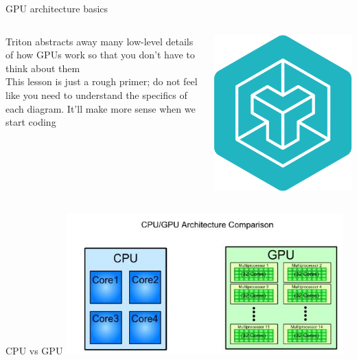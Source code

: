 \documentclass[aspectratio=169]{beamer}
\begin{document}
\begin{frame}{GPU architecture basics}
\begin{columns}[T]
    \begin{column}[T]{0.5\textwidth}
    Triton abstracts away many low-level details of how GPUs work so that you don't have to think about them \\
    \vspace{0.1in}
    This lesson is just a rough primer; do not feel like you need to understand the specifics of each diagram. It'll make more sense when we start coding
    \end{column}
    \begin{column}{0.5\textwidth}
        \includegraphics[height=0.8\textheight]{pics/triton-logo.png}
    \end{column}
\end{columns}
\end{frame}

\begin{frame}{CPU vs GPU}
\centering
\includegraphics[width=0.8\textwidth]{pics/architecture_comparison-2717927587.jpg}
\end{frame}
\end{document}
